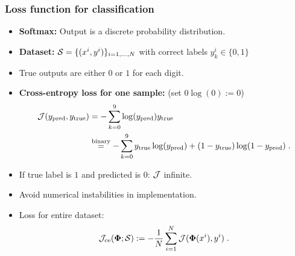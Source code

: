 \documentclass[10pt,hyperref={pdfpagelabels=false}]{beamer}
\begin{document}
\begin{frame}
    \frametitle{Loss function for classification}
        {\small
        \begin{itemize}
            \item {\bf Softmax:} Output is a discrete probability distribution.
            \item {\bf Dataset:} $\mathcal{S}=\{(x^i, y^i)\}_{i=1,\dots,N}$ with correct labels $y^i_k\in\{0,1\}$
            \item True outputs are either $0$ or $1$ for each digit.
            \item {\bf Cross-entropy loss for one sample:} (set $0\log(0):=0$)
                \begin{equation*}
                    \begin{split}
                        \mathcal{J}(y_{\text{pred}}, y_{\text{true}}) &=
                            -\sum_{k=0}^9 \log(y_{\text{pred}})y_{\text{true}} \\
                            &\stackrel{\text{binary}}{=}
                            -\sum_{k=0}^9 y_{\text{true}}\log(y_{\text{pred}})
                                + (1-y_{\text{true}}) \log(1-y_{\text{pred}})
                            \;.
                    \end{split}
                \end{equation*}
            \item If true label is $1$ and predicted is $0$: $\mathcal{J}$ infinite.
            \item Avoid numerical instabilities in implementation.
            \item Loss for entire dataset:
            $$
            \mathcal{J}_{\text{ce}}(\boldsymbol{\Phi}; \mathcal{S}) :=
                -\frac{1}{N}\sum_{i=1}^N \mathcal{J}(\boldsymbol{\Phi}(x^i), y^i)
                \;.
            $$

        \end{itemize}
        }
\end{frame}
\end{document}
